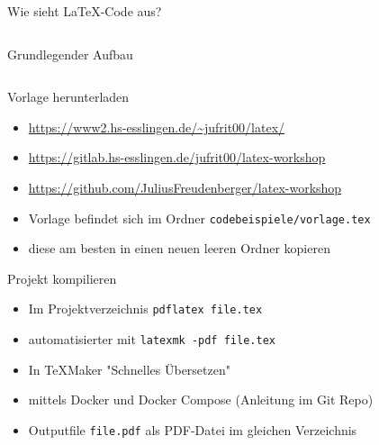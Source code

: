 \documentclass[presentation,aspectratio=169]{beamer}
\begin{document}
\begin{frame}{Wie sieht \LaTeX-Code aus?}
  \inputminted{latex}{codebeispiele/beispiel.tex}
\end{frame}

\begin{frame}{Grundlegender Aufbau}
  \inputminted{latex}{codebeispiele/aufbau.tex}
\end{frame}

\begin{frame}[fragile]{Vorlage herunterladen}
  \begin{itemize}
    \item \href{https://www2.hs-esslingen.de/~jufrit00/latex/}{https://www2.hs-esslingen.de/\textasciitilde{}jufrit00/latex/}
    \item \href{https://gitlab.hs-esslingen.de/jufrit00/latex-workshop}{https://gitlab.hs-esslingen.de/jufrit00/latex-workshop}
    \item \href{https://github.com/JuliusFreudenberger/latex-workshop}{https://github.com/JuliusFreudenberger/latex-workshop}
      \bigskip
    \item Vorlage befindet sich im Ordner \verb|codebeispiele/vorlage.tex|
    \item diese am besten in einen neuen leeren Ordner kopieren
  \end{itemize}
\end{frame}

\begin{frame}[fragile]{Projekt kompilieren}
  \begin{itemize}
    \item Im Projektverzeichnis \verb|pdflatex file.tex|
    \item automatisierter mit \verb|latexmk -pdf file.tex|
    \item In \TeX{}Maker "Schnelles Übersetzen"
    \item mittels Docker und Docker Compose (Anleitung im Git Repo)
    \item Outputfile \verb|file.pdf| als PDF-Datei im gleichen Verzeichnis
  \end{itemize}
\end{frame}
\end{document}

